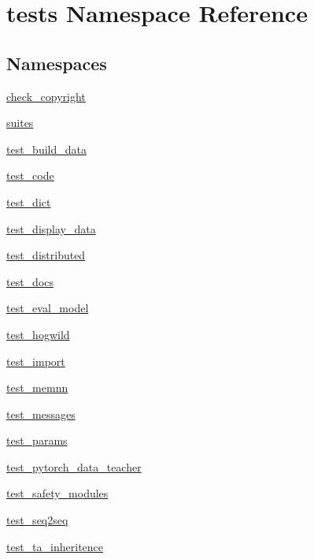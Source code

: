 \hypertarget{namespacetests}{}\section{tests Namespace Reference}
\label{namespacetests}
\subsection*{Namespaces}
\begin{DoxyCompactItemize}
\item 
 \hyperlink{namespacetests_1_1check__copyright}{check\+\_\+copyright}
\item 
 \hyperlink{namespacetests_1_1suites}{suites}
\item 
 \hyperlink{namespacetests_1_1test__build__data}{test\+\_\+build\+\_\+data}
\item 
 \hyperlink{namespacetests_1_1test__code}{test\+\_\+code}
\item 
 \hyperlink{namespacetests_1_1test__dict}{test\+\_\+dict}
\item 
 \hyperlink{namespacetests_1_1test__display__data}{test\+\_\+display\+\_\+data}
\item 
 \hyperlink{namespacetests_1_1test__distributed}{test\+\_\+distributed}
\item 
 \hyperlink{namespacetests_1_1test__docs}{test\+\_\+docs}
\item 
 \hyperlink{namespacetests_1_1test__eval__model}{test\+\_\+eval\+\_\+model}
\item 
 \hyperlink{namespacetests_1_1test__hogwild}{test\+\_\+hogwild}
\item 
 \hyperlink{namespacetests_1_1test__import}{test\+\_\+import}
\item 
 \hyperlink{namespacetests_1_1test__memnn}{test\+\_\+memnn}
\item 
 \hyperlink{namespacetests_1_1test__messages}{test\+\_\+messages}
\item 
 \hyperlink{namespacetests_1_1test__params}{test\+\_\+params}
\item 
 \hyperlink{namespacetests_1_1test__pytorch__data__teacher}{test\+\_\+pytorch\+\_\+data\+\_\+teacher}
\item 
 \hyperlink{namespacetests_1_1test__safety__modules}{test\+\_\+safety\+\_\+modules}
\item 
 \hyperlink{namespacetests_1_1test__seq2seq}{test\+\_\+seq2seq}
\item 
 \hyperlink{namespacetests_1_1test__ta__inheritence}{test\+\_\+ta\+\_\+inheritence}

\end{DoxyCompactItemize}
